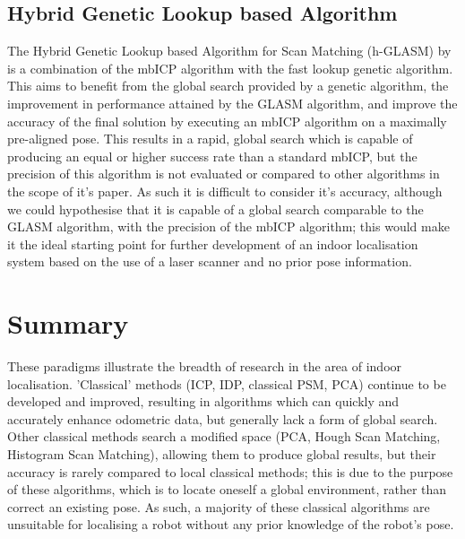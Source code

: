 \documentclass[authoryearcitations]{UoYCSproject}
\begin{document}
\subsection{Hybrid Genetic Lookup based Algorithm}
The Hybrid Genetic Lookup based Algorithm for Scan Matching (h-GLASM) by \citet{Lenac2011-co} is a combination of the mbICP algorithm with the fast lookup genetic algorithm. This aims to benefit from the global search provided by a genetic algorithm, the improvement in performance attained by the GLASM algorithm, and improve the accuracy of the final solution by executing an mbICP algorithm on a maximally pre-aligned pose. This results in a rapid, global search which is capable of producing an equal or higher success rate than a standard mbICP, but the precision of this algorithm is not evaluated or compared to other algorithms in the scope of it's paper. As such it is difficult to consider it's accuracy, although we could hypothesise that it is capable of a global search comparable to the GLASM algorithm, with the precision of the mbICP algorithm; this would make it the ideal starting point for further development of an indoor localisation system based on the use of a laser scanner and no prior pose information.

\section{Summary}
These paradigms illustrate the breadth of research in the area of indoor localisation. 'Classical' methods (ICP, IDP, classical PSM, PCA) continue to be developed and improved, resulting in algorithms which can quickly and accurately enhance odometric data, but generally lack a form of global search. Other classical methods search a modified space (PCA, Hough Scan Matching, Histogram Scan Matching), allowing them to produce global results, but their accuracy is rarely compared to local classical methods; this is due to the purpose of these algorithms, which is to locate oneself a global environment, rather than correct an existing pose. As such, a majority of these classical algorithms are unsuitable for localising a robot without any prior knowledge of the robot's pose.
\end{document}
